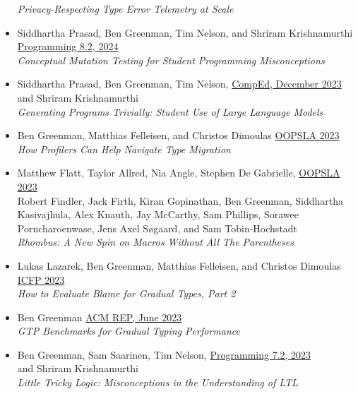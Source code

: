 \documentclass[11pt]{article}
\begin{document}
\begin{itemize}
  \emph{Privacy-Respecting Type Error Telemetry at Scale} \hfill {}
\item
  Siddhartha Prasad, Ben Greenman, Tim Nelson, and Shriram Krishnamurthi \hfill \href{https://2024.programming-conference.org/}{Programming 8.2, 2024} \\
  \emph{Conceptual Mutation Testing for Student Programming Misconceptions} \hfill {}
\item
  Siddhartha Prasad, Ben Greenman, Tim Nelson, \hfill \href{https://comped.acm.org/call-for-participation-2/}{CompEd, December 2023} \\
      and Shriram Krishnamurthi \\
    \emph{Generating Programs Trivially: Student Use of Large Language Models} \hfill {}
\item
  Ben Greenman, Matthias Felleisen, and Christos Dimoulas \hfill \href{https://2023.splashcon.org/track/splash-2023-oopsla}{OOPSLA 2023} \\
  \emph{How Profilers Can Help Navigate Type Migration} \hfill {}
\item
  Matthew Flatt, Taylor Allred, Nia Angle, Stephen De Gabrielle, \hfill \href{https://2023.splashcon.org/track/splash-2023-oopsla}{OOPSLA 2023} \\
  Robert Findler, Jack Firth, Kiran Gopinathan, Ben Greenman, Siddhartha Kasivajhula,
  Alex Knauth, Jay McCarthy, Sam Phillips, Sorawee Porncharoenwase, Jens Axel Søgaard, and Sam Tobin-Hochstadt \\
  \emph{Rhombus: A New Spin on Macros Without All The Parentheses} \hfill {}
\item
  Lukas Lazarek, Ben Greenman, Matthias Felleisen, and Christos Dimoulas \hfill \href{https://icfp23.sigplan.org/}{ICFP 2023} \\
  \emph{How to Evaluate Blame for Gradual Types, Part 2} \hfill {}
\item
  Ben Greenman \hfill \href{https://acm-rep.github.io/2023/}{ACM REP, June 2023} \\
    \emph{GTP Benchmarks for Gradual Typing Performance} \hfill {}
\item
  Ben Greenman, Sam Saarinen, Tim Nelson, \hfill \href{https://2023.programming-conference.org/}{Programming 7.2, 2023} \\
   and Shriram Krishnamurthi  \\ 
    \emph{Little Tricky Logic: Misconceptions in the Understanding of LT\/L} \hfill {}

\end{itemize}
\end{document}
